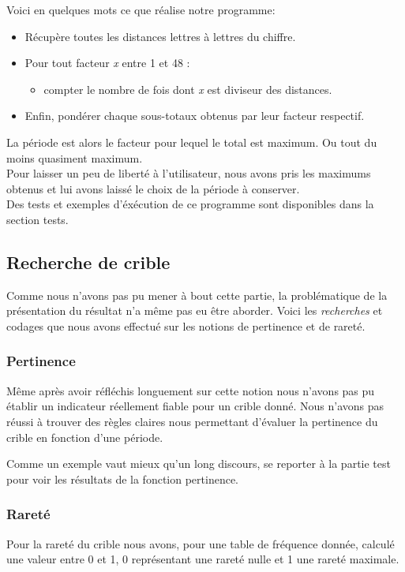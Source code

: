 \documentclass[a4paper, 11pt]{article}
\begin{document}
Voici en quelques mots ce que réalise notre programme:
\begin{itemize}
\item Récupère toutes les distances lettres à lettres du chiffre.
\item Pour tout facteur \textit{x} entre 1 et 48 :
  \begin{itemize}
  \item compter le nombre de fois dont \textit{x} est diviseur des
    distances.
  \end{itemize}
\item Enfin, pondérer chaque sous-totaux obtenus par leur facteur
  respectif.
\end{itemize}

La période est alors le facteur pour lequel le total est maximum. Ou
tout du moins quasiment maximum.\\
Pour laisser un peu de liberté à l'utilisateur, nous avons pris les
maximums obtenus et lui avons laissé le choix de la période à conserver.\\

Des tests et exemples d'éxécution de ce programme sont disponibles
dans la section tests.


\subsection{Recherche de crible}
Comme nous n'avons pas pu mener à bout cette partie, la problématique
de la présentation du résultat n'a même pas eu être aborder.
Voici les \textit{recherches} et codages que nous avons effectué sur
les notions de pertinence et de rareté.

\subsubsection{Pertinence}
Même après avoir réfléchis longuement sur cette notion nous n'avons
pas pu établir un indicateur réellement fiable pour un crible donné.
Nous n'avons pas réussi à trouver des règles claires nous permettant
d'évaluer la pertinence du crible en fonction d'une période.

Comme un exemple vaut mieux qu'un long discours, se reporter à la
partie test pour voir les résultats de la fonction pertinence.


\subsubsection{Rareté}
Pour la rareté du crible nous avons, pour une table de
fréquence donnée, calculé une valeur entre 0 et 1, 0 représentant une
rareté nulle et 1 une rareté maximale.
\end{document}
